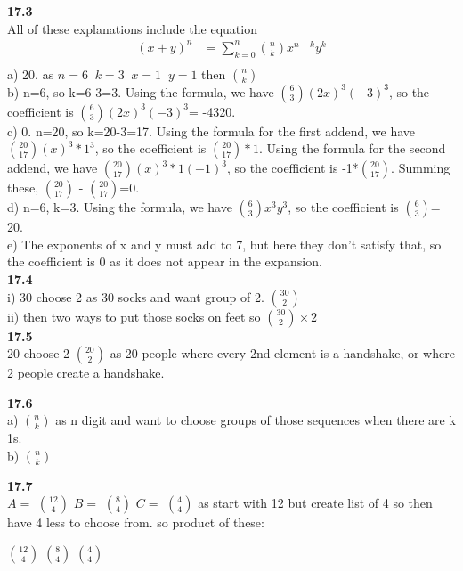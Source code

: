 \documentclass[12pt]{article}
\begin{document}
\begin{enumerate}
\textbf{17.3} \\
All of these explanations include the equation 
\begin{align*}
  (x+y)^{n} &= \sum_{k=0}^{n} {n \choose k} x^{n-k} y^{k}\\
\end{align*}
 a) 20. as $n=6 \;\; k = 3 \;\; x=1 \;\; y=1$ then $n \choose k$ \\
 b) n=6, so k=6-3=3. Using the formula, we have ${6 \choose 3}(2x)^{3}(-3)^{3}$, so the coefficient is ${6 \choose 3}(2x)^{3}(-3)^{3}$= -4320.\\
 c) 0. n=20, so k=20-3=17. Using the formula for the first addend, we have ${20 \choose 17}(x)^{3}*1^{3}$, so the coefficient is ${20 \choose 17}*1$. Using the formula for the second addend, we have ${20 \choose 17}(x)^{3}*1(-1)^{3}$, so the coefficient is -1*${20 \choose 17}.$ Summing these, ${20 \choose 17}$ - ${20 \choose 17}$=0.\\ 
 d)  n=6, k=3. Using the formula, we have ${6 \choose 3}x^{3}y^{3}$, so the coefficient is ${6 \choose 3}$= 20.  \\
 e) The exponents of x and y must add to 7, but here they don't satisfy that, so the coefficient is 0 as it does not appear in the expansion. \\ 
 

\textbf{17.4} \\
 i) 30 choose 2 as 30 socks and want group of 2. $30 \choose 2$ \\ 
 ii) then two ways to put those socks on feet so ${30 \choose 2} \times 2$   \\ 
 
\textbf{17.5} \\ 
 20 choose 2 $20 \choose 2$ as 20 people where every 2nd element is a handshake, or where 2 people create a handshake. 

\textbf{17.6} \\ 
 a) $n \choose k$ as n digit and want to choose groups of those sequences when there are k 1s. \\ 
 b) $n \choose k$ 


\textbf{17.7} \\ 

    $A =$ $12 \choose 4 $
    $B = $ $8 \choose 4$
    $C = $ $4 \choose 4$
    as start with 12 but create list of 4 so then have 4 less to choose from. 
    so product of these:  
    
    $ 12 \choose 4$ $8 \choose 4$ $4 \choose 4$ \\ 
    


\end{enumerate}
\end{document}
